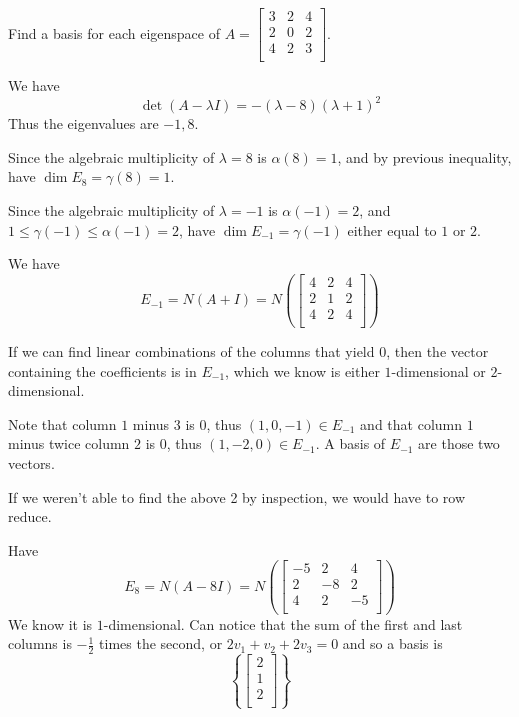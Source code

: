 \documentclass{article}
\begin{document}
    \begin{example}
      Find a basis for each eigenspace of $A =
      \begin{bmatrix}
        3 & 2 & 4\\
        2 & 0 & 2\\
        4 & 2 & 3\\
      \end{bmatrix}$.

      We have \[
        \det (A - \lambda I) = -(\lambda - 8)(\lambda + 1)^2
      \]
      Thus the eigenvalues are $-1, 8$.

      Since the algebraic multiplicity of $\lambda = 8$ is $\alpha(8) = 1$, and by previous inequality, have $\dim E_8 = \gamma(8) = 1$.

      Since the algebraic multiplicity of $\lambda = -1$ is $\alpha(-1) = 2$, and $1 \leq \gamma(-1) \leq \alpha(-1) = 2$, have $\dim E_{-1} = \gamma(-1)$ either equal to $1$ or $2$.

      We have \[
        E_{-1} = N(A + I) = N\left(
          \begin{bmatrix}
            4 & 2 & 4\\
            2 & 1 & 2\\
            4 & 2 & 4\\
        \end{bmatrix}\right)
      \]

      If we can find linear combinations of the columns that yield $0$, then the vector containing the coefficients is in $E_{-1}$, which we know is either $1$-dimensional or $2$-dimensional.

      Note that column $1$ minus $3$ is $0$, thus $(1, 0, -1) \in E_{-1}$ and that column $1$ minus twice column $2$ is $0$, thus $(1, -2, 0) \in E_{-1}$. A basis of $E_{-1}$ are those two vectors.

      If we weren't able to find the above 2 by inspection, we would have to row reduce.

      Have \[
        E_8 = N(A - 8I) = N\left(
          \begin{bmatrix}
            -5 & 2 & 4\\
            2 & -8 & 2\\
            4 & 2 & -5\\
        \end{bmatrix}\right)
      \]
      We know it is $1$-dimensional. Can notice that the sum of the first and last columns is $-\frac{1}{2}$ times the second, or $2v_1 + v_2 + 2v_3 = 0$ and so a basis is \[
        \left\{
          \begin{bmatrix}
            2\\1\\2\\
        \end{bmatrix}\right\}
      \]
    \end{example}
\end{document}

